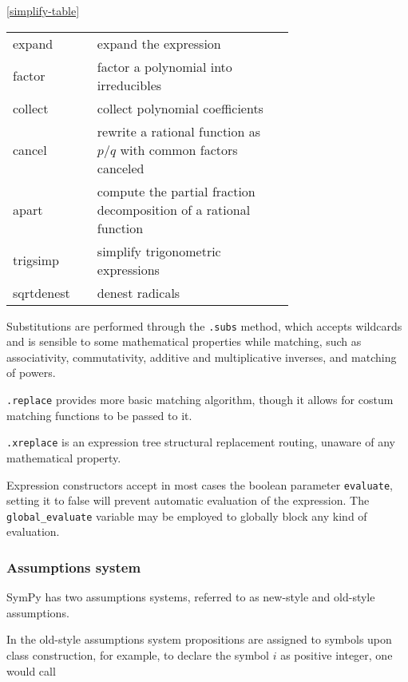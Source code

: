 \ref{simplify-table}
\begin{tabular}{l|p{0.7\linewidth}}
expand & expand the expression \\
factor & factor a polynomial into irreducibles \\
collect & collect polynomial coefficients \\
cancel & rewrite a rational function as $p/q$ with common factors canceled \\
apart & compute the partial fraction decomposition of a rational function \\
trigsimp & simplify trigonometric expressions~\cite{fu2006automated} \\
sqrtdenest & denest radicals \\
\end{tabular}


Substitutions are performed through the \texttt{.subs} method, which accepts
wildcards and is sensible to some mathematical properties while matching,
such as associativity, commutativity,  additive and multiplicative inverses,
and matching of powers.

\texttt{.replace} provides more basic matching algorithm,
though it allows for costum matching functions to be passed to it.

\texttt{.xreplace} is an expression tree structural replacement routing,
unaware of any mathematical property.



Expression constructors accept in most cases the boolean parameter \texttt{evaluate},
setting it to false will prevent automatic evaluation of the expression.
The \verb|global_evaluate| variable may be employed to globally block any kind
of evaluation.


\subsubsection{Assumptions system}



SymPy has two assumptions systems, referred to as new-style and old-style assumptions.

In the old-style assumptions system propositions are assigned to symbols
upon class construction, for example, to declare the symbol $i$ as positive integer,
one would call

